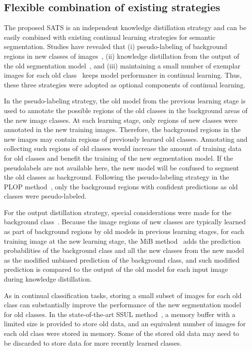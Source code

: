 \documentclass[onecolumn,conference,compsoc]{IEEEtran}
\begin{document}
\begin{spacing}{1.5}
\subsection{Flexible combination of existing strategies}
The proposed SATS is an independent knowledge distillation strategy and can be easily combined with existing continual learning strategies for semantic segmentation.  {Studies have revealed} that (i) pseudo-labeling of background regions in new classes of images~\cite{PLOP,ST-CIL,SSUL}, (ii) knowledge distillation from the output of the old segmentation model~\cite{MiB, PLOP}, and (iii)  {maintaining} a small number of exemplar images for each old class~\cite{SSUL} keeps model performance in continual learning. Thus, these three strategies were adopted as optional components of continual learning.

 {In the} pseudo-labeling strategy, the old model from the previous learning stage  {is used} to annotate the possible regions of the old classes in the background areas of the new image classes. At each learning stage, only regions of new classes were annotated in the new training images.  {Therefore,} the background regions in the new images may contain regions of previously learned old classes. Annotating and collecting such regions of old classes would  increase the  {amount} of training data for old classes and benefit the training of the new segmentation model.
If the pseudolabels are not available here, the new model will be confused to segment the old classes as background. Following the pseudo-labeling strategy in the PLOP method~\cite{PLOP}, only the background regions with confident predictions as old classes were pseudo-labeled.

For the output distillation strategy, special  {considerations were} made for the background class~\cite{MiB}.  {Because the} image regions of new classes are  {typically} learned as part of background regions by old models in previous learning stages, for each training image at the new learning stage, the MiB method~\cite{MiB} adds the prediction probabilities of the background class and all the new classes from the new model as the modified unbiased prediction of the background class, and such modified prediction is compared to the output of the old model for each input image during knowledge distillation.

As in continual classification tasks, storing a small subset of images for each old class can substantially improve the performance of the new segmentation model for old classes.  {In the} state-of-the-art SSUL method~\cite{MiB}, a memory buffer with a limited size is provided to store old data, and an equivalent number of images for each old class were stored in memory.  {Some of the} stored old data may need to be discarded to store data for more recently learned classes.




\end{spacing}
\end{document}
